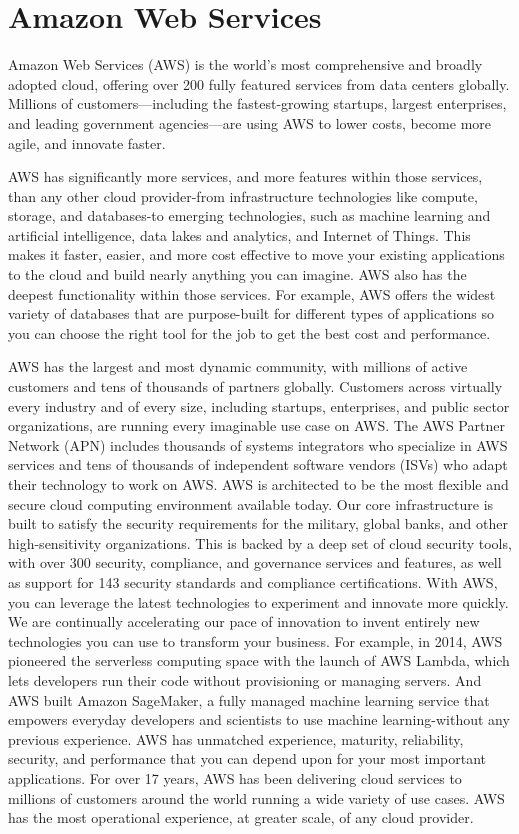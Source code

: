 \section{Amazon Web Services}

Amazon Web Services (AWS) is the world's most comprehensive and broadly adopted cloud, offering over 200 fully featured services from data centers globally. Millions of customers—including the fastest-growing startups, largest enterprises, and leading government agencies—are using AWS to lower costs, become more agile, and innovate faster. \cite{EuAmazonWebServices}

AWS has significantly more services, and more features within those services, than any other cloud provider-from infrastructure technologies like compute, storage, and databases-to emerging technologies, such as machine learning and artificial intelligence, data lakes and analytics, and Internet of Things. This makes it faster, easier, and more cost effective to move your existing applications to the cloud and build nearly anything you can imagine.
AWS also has the deepest functionality within those services. For example, AWS offers the widest variety of databases that are purpose-built for different types of applications so you can choose the right tool for the job to get the best cost and performance.

AWS has the largest and most dynamic community, with millions of active customers and tens of thousands of partners globally. Customers across virtually every industry and of every size, including startups, enterprises, and public sector organizations, are running every imaginable use case on AWS. The AWS Partner Network (APN) includes thousands of systems integrators who specialize in AWS services and tens of thousands of independent software vendors (ISVs) who adapt their technology to work on AWS.
AWS is architected to be the most flexible and secure cloud computing environment available today. Our core infrastructure is built to satisfy the security requirements for the military, global banks, and other high-sensitivity organizations. This is backed by a deep set of cloud security tools, with over 300 security, compliance, and governance services and features, as well as support for 143 security standards and compliance certifications.
With AWS, you can leverage the latest technologies to experiment and innovate more quickly. We are continually accelerating our pace of innovation to invent entirely new technologies you can use to transform your business. For example, in 2014, AWS pioneered the serverless computing space with the launch of AWS Lambda, which lets developers run their code without provisioning or managing servers. And AWS built Amazon SageMaker, a fully managed machine learning service that empowers everyday developers and scientists to use machine learning-without any previous experience.
AWS has unmatched experience, maturity, reliability, security, and performance that you can depend upon for your most important applications. For over 17 years, AWS has been delivering cloud services to millions of customers around the world running a wide variety of use cases. AWS has the most operational experience, at greater scale, of any cloud provider. \cite{WhatIsAWS}

